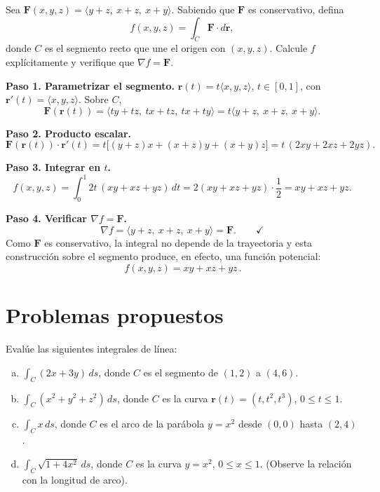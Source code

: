 \begin{prob}
Sea $\mathbf F(x,y,z)=\langle y+z,\ x+z,\ x+y\rangle$. Sabiendo que
$\mathbf F$ es conservativo, defina
\[
f(x,y,z)=\int_C \mathbf F\cdot d\mathbf r,
\]
donde $C$ es el segmento recto que une el origen con $(x,y,z)$. Calcule $f$
explícitamente y verifique que $\nabla f=\mathbf F$.
\begin{myproof}
\textbf{Paso 1. Parametrizar el segmento.}
$\mathbf r(t)=t\langle x,y,z\rangle$, $t\in[0,1]$, con
$\mathbf r'(t)=\langle x,y,z\rangle$. Sobre $C$,
\[
\mathbf F(\mathbf r(t))
=\langle ty+tz,\ tx+tz,\ tx+ty\rangle
=t\langle y+z,\ x+z,\ x+y\rangle.
\]

\textbf{Paso 2. Producto escalar.}
\[
\mathbf F(\mathbf r(t))\cdot\mathbf r'(t)
=t\bigl[(y+z)x+(x+z)y+(x+y)z\bigr]
=t\,(2xy+2xz+2yz).
\]

\textbf{Paso 3. Integrar en $t$.}
\[
f(x,y,z)=\int_0^1 2t\,(xy+xz+yz)\,dt
=2(xy+xz+yz)\cdot\frac12=xy+xz+yz.
\]

\textbf{Paso 4. Verificar $\nabla f=\mathbf F$.}
\[
\nabla f=\langle y+z,\ x+z,\ x+y\rangle=\mathbf F.\qquad\checkmark
\]
Como $\mathbf F$ es conservativo, la integral no depende de la trayectoria y
esta construcción sobre el segmento produce, en efecto, una función potencial:
\[
\boxed{\,f(x,y,z)=xy+xz+yz\,}.
\]
\end{myproof}
\end{prob}

\section{Problemas propuestos}

\begin{prob}
Evalúe las siguientes integrales de línea:
\begin{enumerate}[a)]
  \item \(\displaystyle \int_C (2x + 3y)\,ds\), donde \(C\) es el
  segmento de \((1,2)\) a \((4,6)\).
  \item \(\displaystyle \int_C (x^2 + y^2 + z^2)\,ds\), donde \(C\) es
  la curva \(\mathbf{r}(t) = (t, t^2, t^3)\), \(0\le t\le 1\).
  \item \(\displaystyle \int_C x\,ds\), donde \(C\) es el arco de
  la parábola \(y = x^2\) desde \((0,0)\) hasta \((2,4)\).
  \item \(\displaystyle \int_C \sqrt{1 + 4x^2}\,ds\), donde \(C\) es
  la curva \(y = x^2\), \(0\le x\le 1\). (Observe la relación con
  la longitud de arco).
\end{enumerate}
\end{prob}

